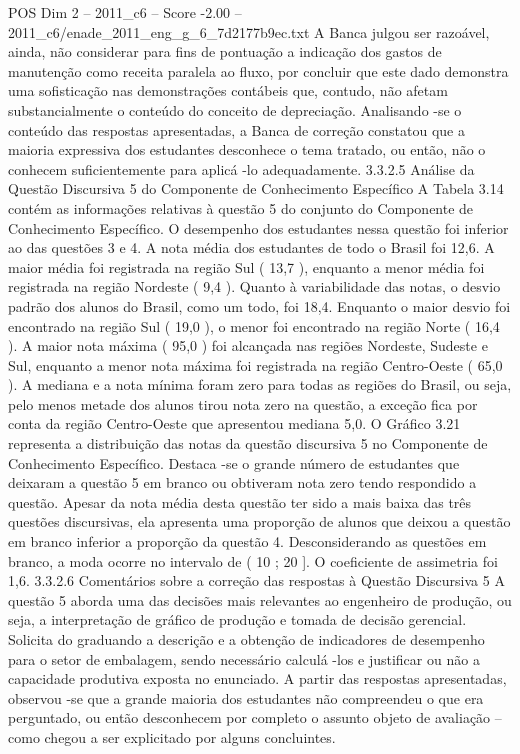 \begin{textsample}{POS Dim 2 – 2011\_c6 – Score -2.00 – 2011\_c6/enade\_2011\_eng\_g\_6\_7d2177b9ec.txt}
A Banca julgou ser razoável, ainda, não considerar para fins de pontuação a indicação dos gastos de manutenção como receita paralela ao fluxo, por concluir que este dado demonstra uma sofisticação nas demonstrações contábeis que, contudo, não afetam substancialmente o conteúdo do conceito de depreciação.
Analisando -se o conteúdo das respostas apresentadas, a Banca de correção constatou que a maioria expressiva dos estudantes desconhece o tema tratado, ou então, não o conhecem suficientemente para aplicá -lo adequadamente. 3.3.2.5 Análise da Questão Discursiva 5 do Componente de Conhecimento Específico A Tabela 3.14 contém as informações relativas à questão 5 do conjunto do Componente de Conhecimento Específico.
O desempenho dos estudantes nessa questão foi inferior ao das questões 3 e 4.
A nota média dos estudantes de todo o Brasil foi 12,6.
A maior média foi registrada na região Sul ( 13,7 ), enquanto a menor média foi registrada na região Nordeste ( 9,4 ).
Quanto à variabilidade das notas, o desvio padrão dos alunos do Brasil, como um todo, foi 18,4.
Enquanto o maior desvio foi encontrado na região Sul ( 19,0 ), o menor foi encontrado na região Norte ( 16,4 ).
A maior nota máxima ( 95,0 ) foi alcançada nas regiões Nordeste, Sudeste e Sul, enquanto a menor nota máxima foi registrada na região Centro-Oeste ( 65,0 ).
A mediana e a nota mínima foram zero para todas as regiões do Brasil, ou seja, pelo menos metade dos alunos tirou nota zero na questão, a exceção fica por conta da região Centro-Oeste que apresentou mediana 5,0.
O Gráfico 3.21 representa a distribuição das notas da questão discursiva 5 no Componente de Conhecimento Específico.
Destaca -se o grande número de estudantes que deixaram a questão 5 em branco ou obtiveram nota zero tendo respondido a questão.
Apesar da nota média desta questão ter sido a mais baixa das três questões discursivas, ela apresenta uma proporção de alunos que deixou a questão em branco inferior a proporção da questão 4.
Desconsiderando as questões em branco, a moda ocorre no intervalo de ( 10 ; 20 ].
O coeficiente de assimetria foi 1,6. 3.3.2.6 Comentários sobre a correção das respostas à Questão Discursiva 5 A questão 5 aborda uma das decisões mais relevantes ao engenheiro de produção, ou seja, a interpretação de gráfico de produção e tomada de decisão gerencial.
Solicita do graduando a descrição e a obtenção de indicadores de desempenho para o setor de embalagem, sendo necessário calculá -los e justificar ou não a capacidade produtiva exposta no enunciado.
A partir das respostas apresentadas, observou -se que a grande maioria dos estudantes não compreendeu o que era perguntado, ou então desconhecem por completo o assunto objeto de avaliação – como chegou a ser explicitado por alguns concluintes.

\end{textsample}
